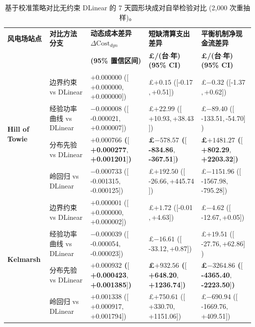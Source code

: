 \begin{table}[!t]
\centering
\footnotesize
\renewcommand{\arraystretch}{0.90}
\setlength{\tabcolsep}{2.5pt}
\caption{基于校准策略对比无约束 DLinear 的 7 天圆形块成对自举检验对比 (2,000 次重抽样)。}
\label{tab:paired_bootstrap}
\begin{threeparttable}
\begin{tabularx}{\textwidth}{p{2.2cm}p{3.0cm}>{\centering\arraybackslash}X>{\centering\arraybackslash}X>{\centering\arraybackslash}X}
\toprule
\textbf{风电场站点} & \textbf{对比方法分支} & \textbf{动态成本差异 $\Delta \text{Cost}_{dyn}$} & \textbf{短缺清算支出差异} & \textbf{平衡机制净现金流差异} \\
 & & \textbf{(95\% 置信区间)} & \textbf{\pounds/(台$\cdot$年) (95\% CI)} & \textbf{\pounds/(台$\cdot$年) (95\% CI)} \\
\midrule
\multirow{4}{=}{\textbf{Hill of Towie}} & 边界约束 vs DLinear & $+0.000000$ ($[$+0.000000$, $+0.000000$]$) & \pounds $+0.15$ ($[$-0.17$, $+0.51$]$) & \pounds $-0.32$ ($[$-1.37$, $+0.62$]$) \\
 & 经验功率曲线 vs DLinear & $-0.000008$ ($[$-0.000021$, $+0.000007$]$) & \pounds $+22.99$ ($[$+10.93$, $+38.43$]$) & \pounds $-89.40$ ($[$-133.51$, $-54.70$]$) \\
 & 分布先验 vs DLinear & \textbf{$+0.000766$ ($[$+0.000277$, $+0.001201$]$)} & \textbf{\pounds $-578.57$ ($[$-834.86$, $-367.51$]$)} & \textbf{\pounds $+1481.27$ ($[$+802.29$, $+2203.32$]$)} \\
 & 岭回归 vs DLinear & $-0.000733$ ($[$-0.001315$, $-0.000125$]$) & \pounds $+192.50$ ($[$-26.66$, $+445.74$]$) & \pounds $-1151.96$ ($[$-1567.98$, $-795.28$]$) \\
\midrule
\multirow{4}{=}{\textbf{Kelmarsh}} & 边界约束 vs DLinear & $+0.000001$ ($[$+0.000000$, $+0.000002$]$) & \pounds $+1.72$ ($[$-0.01$, $+4.63$]$) & \pounds $-4.62$ ($[$-12.67$, $+0.05$]$) \\
 & 经验功率曲线 vs DLinear & $-0.000039$ ($[$-0.000054$, $-0.000023$]$) & \pounds $-16.61$ ($[$-33.12$, $+0.87$]$) & \pounds $+19.51$ ($[$-27.76$, $+62.86$]$) \\
 & 分布先验 vs DLinear & \textbf{$+0.000932$ ($[$+0.000423$, $+0.001385$]$)} & \textbf{\pounds $+932.56$ ($[$+648.20$, $+1236.74$]$)} & \textbf{\pounds $-3264.86$ ($[$-4365.40$, $-2223.50$]$)} \\
 & 岭回归 vs DLinear & $+0.001338$ ($[$+0.000917$, $+0.001794$]$) & \pounds $+750.61$ ($[$+330.70$, $+1151.06$]$) & \pounds $-690.94$ ($[$-1669.76$, $+409.51$]$) \\

\end{tabularx}
\end{threeparttable}
\end{table}
